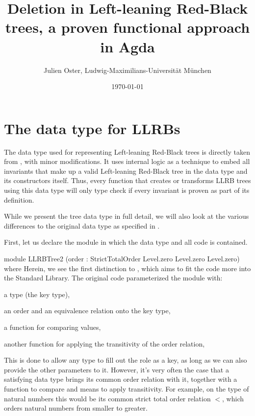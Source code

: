 \documentclass{scrartcl}
\newenvironment{code}{\verbatim}{\endverbatim}
\begin{document}
\title{Deletion in Left-leaning Red-Black trees, a proven functional approach in Agda}
\date{\today}
\author{Julien Oster, Ludwig-Maximilians-Universität München}

\maketitle

\section{The data type for LLRBs}

The data type used for representing Left-leaning Red-Black trees is
directly taken from \cite{eha2009}, with minor modifications. It uses
internal logic as a technique to embed all invariants that make up a
valid Left-leaning Red-Black tree in the data type and its
constructors itself. Thus, every function that creates or transforms
LLRB trees using this data type will only type check if every
invariant is proven as part of its definition.

While we present the tree data type in full detail, we will also look
at the various differences to the original data type as specified in
\cite{eha2009}.

First, let us declare the module in which the data type and
all code is contained.

\begin{code}
module LLRBTree2
  (order : StrictTotalOrder Level.zero Level.zero Level.zero) where
\end{code}
Herein, we see the first distinction to \cite{eha2009}, which aims to
fit the code more into the Standard Library. The original code
parameterized the module with:

\begin{itemize*}
\item a type (the key type),
\item an order and an equivalence relation onto the key type,
\item a function for comparing values,
\item another function for applying the transitivity of the order relation,
\end{itemize*}

This is done to allow any type to fill out the role as a key, as long
as we can also provide the other parameters to it. However, it's very
often the case that a satisfying data type brings its common order
relation with it, together with a function to compare and means to
apply transitivity. For example, on the type of natural numbers this
would be its common strict total order relation $<$, which orders
natural numbers from smaller to greater.
\end{document}
